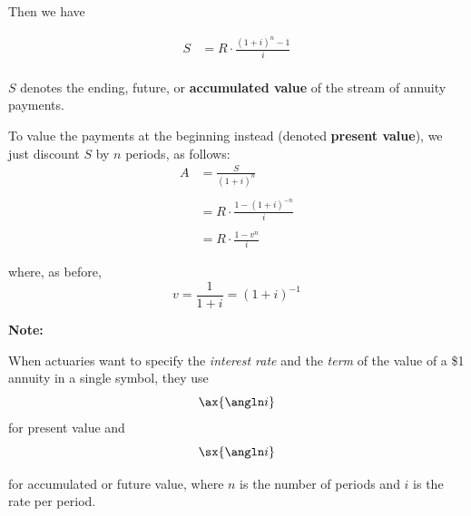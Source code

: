 \documentclass[14pt,twoside]{extarticle}
\begin{document}
Then we have

\begin{align*}
  S & = R \cdot \frac{(1 + i)^n-1}{i} \\
\end{align*}


$S$ denotes the ending, future, or \textbf{accumulated value} of the stream of annuity payments.


To value the payments at the beginning instead (denoted \textbf{present value}), we just discount $S$ by
$n$ periods, as follows:
\begin{align*}
  A & = \frac{S}{(1 + i)^n}              \\\\
    & = R \cdot \frac{1-(1 + i)^{-n}}{i} \\\\
    & = R \cdot \frac{1 - v^n}{i}
\end{align*}

where, as before,
\[
  v = \frac{1}{1+i} = (1+i)^{-1}
\]


\textbf{Note:}

When actuaries want to specify the \emph{interest rate} and the \emph{term} of the value of
a \$1 annuity in a single symbol, they use
  {\Large
    \[
      \ax{\angln i}
    \]
  }
for present value and
  {\Large
    \[
      \sx{ \angln i}
    \]
  }
\vspace{.2in}

for accumulated or future value, where $ n $ is the number of periods and $ i $ is the rate per period.
\end{document}
